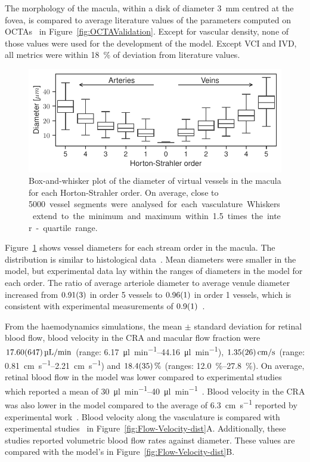 \documentclass[11pt,]{article}
\begin{document}
The morphology of the macula, within a disk of diameter \SI{3}{\mm} centred at the fovea, is compared to average literature values of the parameters computed on OCTAs~\cite{Chu2016,Liu_2021,Ma2021} in Figure~\ref{fig:OCTAValidation}.
Except for vascular density, none of those values were used for the development of the model.
Except VCI and IVD, all metrics were within \SI{18}{\percent} of deviation from literature values.

\begin{figure}[ht!]
  \centering
  \includegraphics[width=.95\textwidth]{Horton_Strahler_Diameter_Distribution}
  \caption{\label{fig:Horton_Strahler}Box-and-whisker plot of the diameter of virtual vessels in the macula for each Horton-Strahler order. On average, close to \SI{5000} vessel segments were analysed for each vasculature. Whiskers extend to the minimum and maximum within \SI{1.5}{} times the inter-quartile range.}  
\end{figure}

Figure~\ref{fig:Horton_Strahler} shows vessel diameters for each stream order in the macula.
The distribution is similar to histological data~\cite{An2020}.
Mean diameters were smaller in the model, but experimental data lay within the ranges of diameters in the model for each order.
The ratio of average arteriole diameter to average venule diameter increased from $\SI{0.91\pm 0.03}{}$
in order 5 vessels to $\SI{0.96\pm0.01}{}$ in order 1 vessels, which is consistent with experimental measurements of $\SI{0.9\pm0.1}{}$~\cite{Goldenberg2013}.  

From the haemodynamics simulations, the mean $\pm$ standard deviation for retinal blood flow, blood velocity in the CRA and macular flow fraction were $\SI[per-mode=symbol]{17.6 \pm 6.47}{\micro\litre\per\minute}$ (range: \SIrange[per-mode=symbol]{6.17}{44.16}{\micro\litre\per\minute}), $\SI[per-mode=symbol]{1.35 \pm 0.26}{\cm\per\second}$ (range: \SIrange[per-mode=symbol]{0.81}{2.21}{\cm\per\second}) and $\SI{18.4 \pm 3.5}{\percent}$ (ranges: \SIrange{12.0}{27.8}{\percent}).
On average, retinal blood flow in the model was lower compared to experimental studies which reported a mean of \SIrange{30}{40}{\micro\litre\per\minute}~\cite{DoblhoffDier2014,Riva1985}.
Blood velocity in the CRA was also lower in the model compared to the average of \SI{6.3}{\cm\per\second} reported by experimental work~\cite{Dorner2009}.
Blood velocity along the vasculature is compared with experimental studies~\cite{DoblhoffDier2014,Riva1985} in Figure~\ref{fig:Flow-Velocity-dist}A.
Additionally, these studies reported volumetric blood flow rates against diameter. These values are compared with the model's in Figure~\ref{fig:Flow-Velocity-dist}B. 
\end{document}
